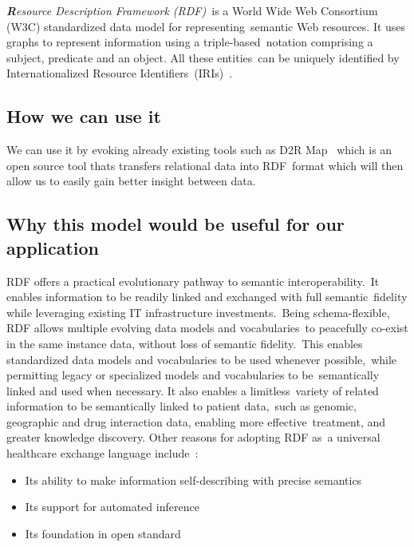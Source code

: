 \documentclass[DIV=calc, paper=a4, fontsize=12pt, onecolumn]{scrartcl}	 %
\newcommand{\initial}[1]{ %
\lettrine[lines=3,lhang=0.3,nindent=0em,slope=0em]{
\color{DarkBlue}
{\textbf{\textit{#1}}}}{}}
\begin{document}
  \initial{R}\textit{esource Description Framework (RDF)}\
  is a World Wide Web Consortium (W3C) standardized data model for representing\
  semantic Web resources. It uses graphs to represent information using a triple-based\
  notation comprising a subject, predicate and an object. All these entities\
  can be uniquely identified by Internationalized Resource Identifiers\
  (IRIs)~\citep{pathak_applying_2012}.

  \subsection{How we can use it}

  We can use it by evoking already existing tools such as D2R Map \citep{_d2r_tool_2013}\
  which is an open source tool thats transfers relational data into RDF\
  format which will then allow us to easily gain better insight between data.\

  \subsection{Why this model would be useful for our application}

  RDF offers a practical evolutionary pathway to semantic interoperability.\
  It enables information to be readily linked and exchanged with full semantic\
  fidelity while leveraging existing IT infrastructure investments.\
  Being schema-flexible, RDF allows multiple evolving data models and vocabularies\
  to peacefully co-exist in the same instance data, without loss of semantic fidelity.\
  This enables standardized data models and vocabularies to be used whenever possible,\ 
  while permitting legacy or specialized models and vocabularies to be\
  semantically linked and used when necessary. It also enables a limitless\
  variety of related information to be semantically linked to patient data,\
  such as genomic, geographic and drug interaction data, enabling more effective\
  treatment, and greater knowledge discovery. Other reasons for adopting RDF as\
  a universal healthcare exchange language include~\citep{_Munnecke_2013}:
  \begin{itemize}
    \itemsep0ex
    \item Its ability to make information self-describing with precise semantics
    \item Its support for automated inference
    \item Its foundation in open standard
  \end{itemize}
\end{document}
